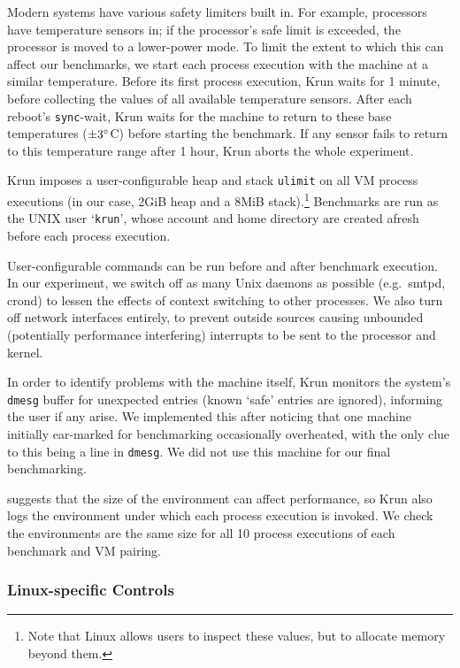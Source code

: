 \documentclass[preprint,numbers,10pt]{sigplanconf}
\newcommand{\krun}{Krun\xspace}
\begin{document}
Modern systems have various safety limiters built in. For example,
processors have temperature sensors in; if the processor's safe limit
is exceeded, the processor is moved to a lower-power mode. To limit the extent to which this can
affect our benchmarks, we start each process execution with the machine at a similar temperature.
Before its first process execution, \krun waits for 1 minute, before collecting
the values of all available temperature sensors. After each reboot's \texttt{sync}-wait, \krun waits
for the machine to return to these base temperatures ($\pm3\degree$C) before
starting the benchmark. If any sensor fails to return to this temperature range
after 1 hour, \krun aborts the whole experiment.

\krun imposes a
user-configurable heap and stack \texttt{ulimit} on all VM process executions
(in our case, 2GiB heap and a 8MiB stack).\footnote{Note that Linux allows users
to inspect these values, but to allocate memory beyond them.} Benchmarks are run
as the UNIX user `\texttt{krun}', whose account and home directory are created
afresh before each process execution.

User-configurable commands can be run before and after benchmark execution. In
our experiment, we switch off as many Unix daemons as possible (e.g.~smtpd,
crond) to lessen the effects of context switching to other processes. We also
turn off network interfaces entirely, to prevent outside sources causing unbounded
(potentially performance interfering) interrupts to be sent to the processor and kernel.

In order to identify problems with the machine itself, \krun monitors the
system's \texttt{dmesg} buffer for unexpected entries (known `safe' entries
are ignored), informing the user if any arise. We implemented this after
noticing that one machine initially ear-marked for benchmarking occasionally
overheated, with the only clue to this being a line in \texttt{dmesg}.
We did not use this machine for our final benchmarking.

  suggests that the size of the environment can affect
performance, so \krun also logs the environment under which each process
execution is invoked. We check the environments are the same size for all 10
process executions of each benchmark and VM pairing.


\subsubsection{Linux-specific Controls}
\end{document}
